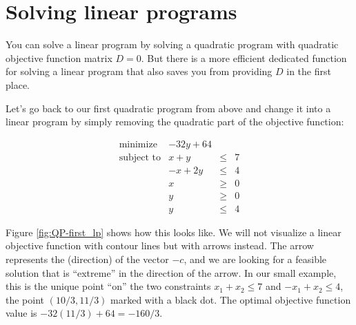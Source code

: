 \section{Solving linear programs}\label{sec:QP-lp}
You can solve a linear program by solving a quadratic program with
quadratic objective function matrix $D=0$. But there is a more efficient
dedicated function for solving a linear program that also saves you
from providing $D$ in the first place. 

Let's go back to our first quadratic program from above and change it 
into a linear program by simply removing the quadratic part of the
objective function:

\[
\begin{array}{lrcl}
\mbox{minimize}       & - 32y + 64 \\
\mbox{subject to}     & x + y &\leq& 7 \\
                      & -x + 2y &\leq& 4 \\
                      & x &\geq& 0 \\
                      & y &\geq& 0 \\
                      & y &\leq& 4
\end{array}
\] 

Figure \ref{fig:QP-first_lp} shows how this looks like. We will not
visualize a linear objective function with contour lines but with
arrows instead. The arrow represents the (direction) of the vector $-c$,
and we are looking for a feasible solution that is ``extreme'' in the direction
of the arrow. In our small example, this is the unique point ``on'' the
two constraints $x_1+x_2\leq 7$ and $-x_1+x_2\leq 4$, the point
$(10/3,11/3)$ marked with a black dot. The optimal objective function
value is $-32(11/3)+64=-160/3$.


